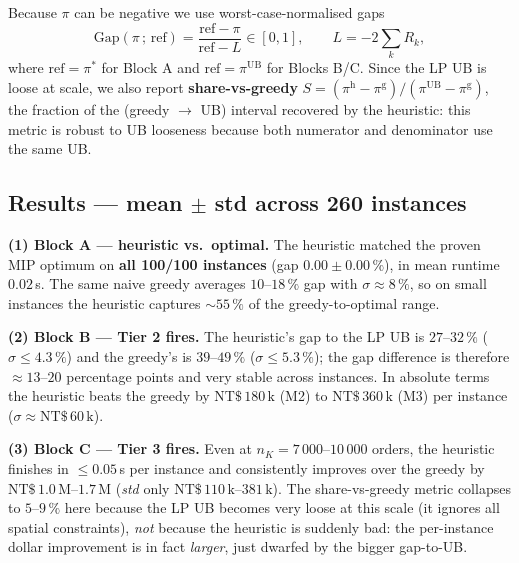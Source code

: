 \documentclass[a4paper, 12pt]{article}
\begin{document}
Because $\pi$ can be negative we use worst-case-normalised gaps
\[
    \mathrm{Gap}(\pi\,;\,\mathrm{ref}) = \frac{\mathrm{ref} - \pi}{\mathrm{ref} - L} \in [0,1],
    \qquad L = -2\!\sum_{k}\! R_k,
\]
where $\mathrm{ref}\!=\!\pi^{\ast}$ for Block A and $\mathrm{ref}\!=\!\pi^{\mathrm{UB}}$ for Blocks B/C. Since the LP UB is loose at scale, we also report \textbf{share-vs-greedy} $S=(\pi^{\mathrm{h}}-\pi^{\mathrm{g}})/(\pi^{\mathrm{UB}}-\pi^{\mathrm{g}})$, the fraction of the (greedy $\to$ UB) interval recovered by the heuristic: this metric is robust to UB looseness because both numerator and denominator use the same UB.

\subsection{Results — mean $\pm$ std across 260 instances}

\begin{center}\scriptsize

\end{center}

\textbf{(1) Block A — heuristic vs.\ optimal.} The heuristic matched the proven MIP optimum on \textbf{all 100/100 instances} (gap $0.00\!\pm\!0.00\,\%$), in mean runtime $0.02$\,s. The same naive greedy averages $10$--$18\,\%$ gap with $\sigma\!\approx\!8\,\%$, so on small instances the heuristic captures $\sim\!55\,\%$ of the greedy-to-optimal range.

\textbf{(2) Block B — Tier 2 fires.} The heuristic's gap to the LP UB is $27$--$32\,\%$ ($\sigma\!\le\!4.3\,\%$) and the greedy's is $39$--$49\,\%$ ($\sigma\!\le\!5.3\,\%$); the gap difference is therefore $\approx\!13$--$20$ percentage points and very stable across instances. In absolute terms the heuristic beats the greedy by $\mathrm{NT}\$\,180\,\mathrm{k}$ (M2) to $\mathrm{NT}\$\,360\,\mathrm{k}$ (M3) per instance ($\sigma\!\approx\!\mathrm{NT}\$\,60\,\mathrm{k}$).

\textbf{(3) Block C — Tier 3 fires.} Even at $n_K\!=\!7\,000$--$10\,000$ orders, the heuristic finishes in $\le 0.05$\,s per instance and consistently improves over the greedy by $\mathrm{NT}\$\,1.0\,\mathrm{M}$--$1.7\,\mathrm{M}$ (\textit{std} only $\mathrm{NT}\$\,110\,\mathrm{k}$--$381\,\mathrm{k}$). The share-vs-greedy metric collapses to $5$--$9\,\%$ here because the LP UB becomes very loose at this scale (it ignores all spatial constraints), \emph{not} because the heuristic is suddenly bad: the per-instance dollar improvement is in fact \emph{larger}, just dwarfed by the bigger gap-to-UB.
\end{document}
